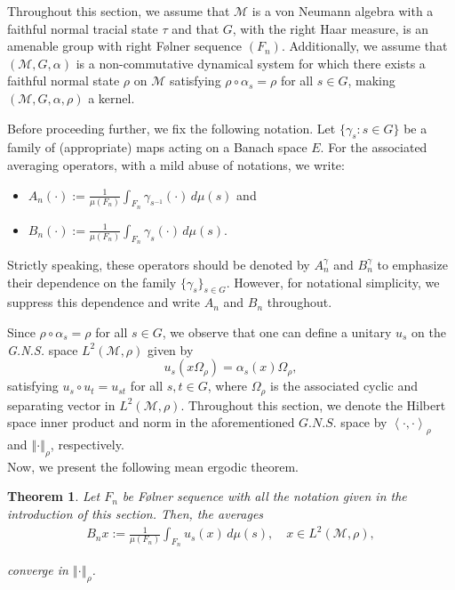 \documentclass[11pt]{amsart}
\newtheorem{thm}{Theorem}[section]
\theoremstyle{definition}
\theoremstyle{myremark}
\numberwithin{equation}{section}
\newcommand{\CM}{\mathcal{M}}
\newcommand{\norm}[1]{\left\Vert#1\right\Vert}
\newcommand\inner[2]{\left\langle #1, #2 \right\rangle}
\begin{document}
		\noindent Throughout this section, we assume that $\CM$ is a von Neumann algebra with a faithful normal tracial state $\tau$ and that $G$, with the right Haar measure, is an amenable group with right F\o lner sequence $(F_n)$. Additionally, we assume that $(\CM, G, \alpha)$ is a non-commutative dynamical system for which there exists a faithful normal state $\rho$ on $\CM$ satisfying $\rho \circ \alpha_s = \rho$ for all $s \in G$, making $(\CM, G, \alpha, \rho)$ a kernel.
		
		Before proceeding further, we fix the following notation. Let 
$\{\gamma_s : s \in G\}$ be a family of (appropriate) maps acting on a Banach space $E$. 
For the associated averaging operators, with  a mild abuse  of notations, we write:
\begin{itemize}
    \item $A_n(\cdot) := \frac{1}{\mu(F_n)} \int_{F_n} \gamma_{s^{-1}}(\cdot)\, d\mu(s)$ and \\
 
    \item $ B_n(\cdot) := \frac{1}{\mu(F_n)} \int_{F_n} \gamma_s(\cdot)\, d\mu(s).$
\end{itemize}
Strictly speaking, these operators should be denoted by $A_n^{\gamma}$ and 
$B_n^{\gamma}$ to emphasize their dependence on the family $\{\gamma_s\}_{s \in G}$.
However, for notational simplicity, we suppress this dependence and write $A_n$ and
$B_n$ throughout.
        
        
        
		
		
		\noindent Since $\rho \circ \alpha_s = \rho$ for all $s \in G$, we observe that one can define a unitary  $u_s$ on the \textit{G.N.S.} space $L^2(\CM, \rho)$ given by 
		\[
		u_s(x \Omega_\rho) = \alpha_s(x) \Omega_\rho,
		\]
		satisfying $u_s \circ u_t = u_{st}$ for all $s, t \in G$, where $\Omega_\rho$ is the associated cyclic and separating vector in $L^2(\CM, \rho)$. Throughout this section, we denote the Hilbert space inner product and norm in the aforementioned $G.N.S.$ space by $\inner{\cdot}{\cdot}_\rho$ and $\norm{\cdot}_\rho$, respectively. \\
		
		\noindent Now, we present the following mean ergodic theorem.

        		\begin{thm}\label{Mean erg}
			Let ${F_n}$ be F\o lner sequence with all the notation given in the introduction of this section. Then, the averages 
            \begin{align*}
                B_nx := \frac{1}{\mu(F_n)} \int_{F_n} u_s(x) \, d\mu(s), \quad x \in L^2(\CM, \rho),
            \end{align*}
				 
			converge in $\norm{\cdot}_\rho$.
		\end{thm}
		
\end{document}

